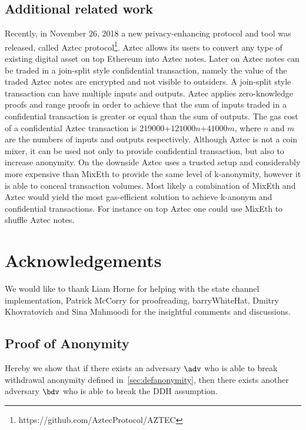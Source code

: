 \documentclass[conference, compsoc]{IEEEtran}
\theoremstyle{definition}
\begin{document}
\subsection{Additional related work}
Recently, in November 26, 2018 a new privacy-enhancing protocol and tool was released, called Aztec protocol\footnote{https://github.com/AztecProtocol/AZTEC}. Aztec allows its users to convert any type of existing digital asset on top Ethereum into Aztec notes. Later on Aztec notes can be traded in a join-split style confidential transaction, namely the value of the traded Aztec notes are encrypted and not visible to outsiders. A join-split style transaction can have multiple inputs and outputs. Aztec applies zero-knowledge proofs and range proofs in order to achieve that the sum of inputs traded in a confidential transaction is greater or equal than the sum of outputs. The gas cost of a confidential Aztec transaction is $\num[group-separator={,}]{219000}$+$\num[group-separator={,}]{121000}n$+$\num[group-separator={,}]{41000}m$, where $n$ and $m$ are the numbers of inputs and outputs respectively.  Although Aztec is not a coin mixer, it can be used not only to provide confidential transaction, but also to increase anonymity. On the downside Aztec uses a trusted setup and considerably more expensive than MixEth to provide the same level of k-anonymity, however it is able to conceal transaction volumes. Most likely a combination of MixEth and Aztec would yield the most gas-efficient solution to achieve k-anonym and confidential transactions. For instance on top Aztec one could use MixEth to shuffle Aztec notes.      

\section{Acknowledgements}
We would like to thank Liam Horne for helping with the state channel implementation, Patrick McCorry for proofreading, barryWhiteHat, Dmitry Khovratovich and Sina Mahmoodi for the insightful comments and discussions. 




\appendix
	
\subsection{Proof of Anonymity} \label{appendanon}
Hereby we show that if there exists an adversary $\adv$ who is able to break withdrawal anonymity defined in~\ref{sec:defanonymity}, then there exists another adversary $\bdv$ who is able to break the DDH assumption.
	
\end{document}
